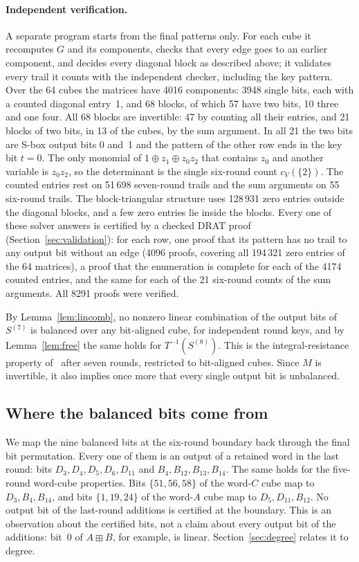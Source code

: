 \documentclass[pdflatex,sn-mathphys-num]{sn-jnl}
\theoremstyle{thmstyleone}
\theoremstyle{thmstylethree}
\theoremstyle{thmstyletwo}
\newcommand{\modadd}{\boxplus}
\newcommand{\NLCZR}{4096}
\newcommand{\NLCZE}{194\,321}
\newcommand{\NLCCE}{4174}
\newcommand{\NLCDR}{8291}
\begin{document}
\paragraph{Independent verification.} A separate program starts from the final patterns only. For each cube it recomputes $G$ and its components, checks that every edge goes to an earlier component, and decides every diagonal block as described above; it validates every trail it counts with the independent checker, including the key pattern. Over the 64 cubes the matrices have 4016 components: 3948 single bits, each with a counted diagonal entry~1, and 68 blocks, of which 57 have two bits, 10 three and one four. All 68 blocks are invertible: 47 by counting all their entries, and 21 blocks of two bits, in 13 of the cubes, by the sum argument. In all 21 the two bits are S-box output bits 0 and~1 and the pattern of the other row ends in the key bit $t=0$. The only monomial of $1\oplus z_1\oplus z_0z_2$ that contains $z_0$ and another variable is $z_0z_2$, so the determinant is the single six-round count $c_V(\{2\})$. The counted entries rest on 51\,698 seven-round trails and the sum arguments on 55 six-round trails. The block-triangular structure uses 128\,931 zero entries outside the diagonal blocks, and a few zero entries lie inside the blocks. Every one of these solver answers is certified by a checked DRAT proof (Section~\ref{sec:validation}): for each row, one proof that its pattern has no trail to any output bit without an edge (\NLCZR{} proofs, covering all \NLCZE{} zero entries of the 64 matrices), a proof that the enumeration is complete for each of the \NLCCE{} counted entries, and the same for each of the 21 six-round counts of the sum arguments. All \NLCDR{} proofs were verified.

By Lemma~\ref{lem:lincomb}, no nonzero linear combination of the output bits of $S^{(7)}$ is balanced over any bit-aligned cube, for independent round keys, and by Lemma~\ref{lem:free} the same holds for $T^{-1}(S^{(8)})$. This is the integral-resistance property of~\cite{hebborn2021} after seven rounds, restricted to bit-aligned cubes. Since $M$ is invertible, it also implies once more that every single output bit is unbalanced.

\subsection{Where the balanced bits come from}
We map the nine balanced bits at the six-round boundary back through the final bit permutation. Every one of them is an output of a retained word in the last round: bits $D_3,D_4,D_5,D_6,D_{11}$ and $B_4,B_{12},B_{13},B_{14}$. The same holds for the five-round word-cube properties. Bits $\{51,56,58\}$ of the word-$C$ cube map to $D_3,B_4,B_{14}$, and bits $\{1,19,24\}$ of the word-$A$ cube map to $D_5,D_{11},B_{12}$. No output bit of the last-round additions is certified at the boundary. This is an observation about the certified bits, not a claim about every output bit of the additions: bit~0 of $A\modadd B$, for example, is linear. Section~\ref{sec:degree} relates it to degree.
\end{document}
